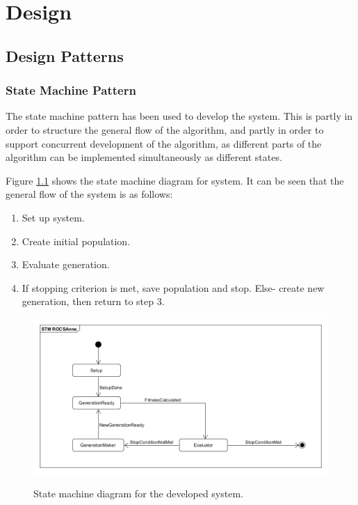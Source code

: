 
\chapter{Design}
\section{Design Patterns}
\subsection{State Machine Pattern}
The state machine pattern has been used to develop the system. This is partly in order to structure the general flow of the algorithm, and partly in order to support concurrent development of the algorithm, as different parts of the algorithm can be implemented simultaneously as different states.

Figure \ref{fig:STM_diagram} shows the state machine diagram for system. It can be seen that the general flow of the system is as follows:
\begin{enumerate}
	\item Set up system.
	\item Create initial population.
	\item Evaluate generation.
	\item If stopping criterion is met, save population and stop. Else-  create new generation, then return to step 3.
\end{enumerate}

\begin{figure}[H]
	\centering
	{\includegraphics[width=\textwidth]{Images/STM_ROGSAnne.PNG}}\\[0.5cm]
	\caption{State machine diagram for the developed system.}
	\label{fig:STM_diagram}
\end{figure}

